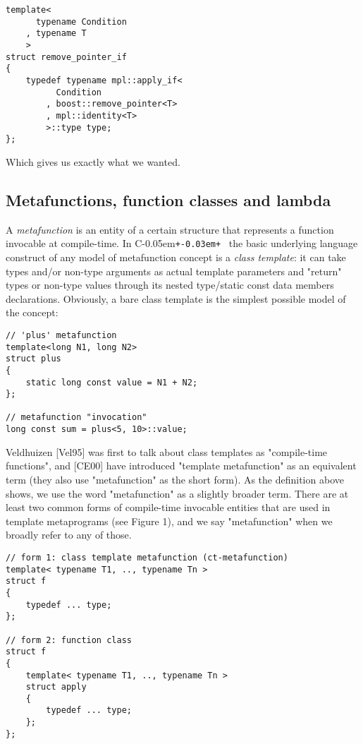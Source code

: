 \documentclass{netobjectdays}
\newcommand{\Cpp}{C\kern-0.05em\texttt{+\kern-0.03em+}%
}
\begin{document}
{\footnotesize
\begin{verbatim}
template<
      typename Condition
    , typename T
    >
struct remove_pointer_if
{
    typedef typename mpl::apply_if<
          Condition
        , boost::remove_pointer<T>
        , mpl::identity<T>
        >::type type;
};
\end{verbatim}
}

Which gives us exactly what we wanted.


\subsection{Metafunctions, function classes and lambda}


A \emph{metafunction} is an entity of a certain structure that
represents a function invocable at compile-time.  In \Cpp\, the basic
underlying language construct of any model of metafunction concept is
a \emph{class template}: it can take types and/or non-type arguments
as actual template parameters and "return" types or non-type values
through its nested type/static const data members
declarations. Obviously, a bare class template is the simplest
possible model of the concept:

{\footnotesize
\begin{verbatim}
// 'plus' metafunction
template<long N1, long N2>
struct plus
{
    static long const value = N1 + N2;
};

// metafunction "invocation"
long const sum = plus<5, 10>::value;
\end{verbatim}
}

Veldhuizen [Vel95] was first to talk about class templates 
as "compile-time functions", and [CE00] have introduced 
"template metafunction" as an equivalent term (they also 
use "metafunction" as the short form). As the definition 
above shows, we use the word "metafunction" as a slightly 
broader term. There are at least two common forms of 
compile-time invocable entities that are used in template 
metaprograms (see Figure 1), and we say "metafunction" when 
we broadly refer to any of those.


{\footnotesize
\begin{verbatim}
// form 1: class template metafunction (ct-metafunction)
template< typename T1, .., typename Tn >
struct f
{
    typedef ... type;
};

// form 2: function class
struct f
{
    template< typename T1, .., typename Tn >
    struct apply
    {
        typedef ... type;
    };
};
\end{verbatim}
}
\end{document}
